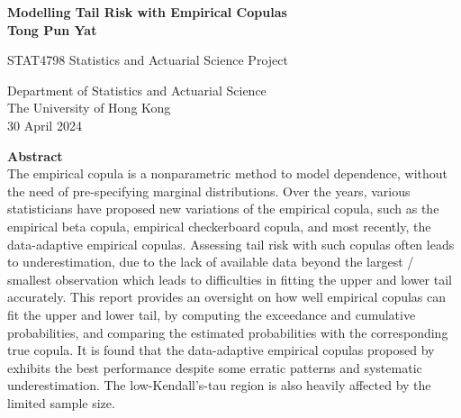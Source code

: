 \documentclass[12pt]{report}
\newcommand{\1}{\mathbf{1}}
\begin{document}
\begin{titlepage}
   \begin{center}
       \vspace*{1cm}
        \LARGE
       \textbf{Modelling Tail Risk with Empirical Copulas} \\

       \vspace{2cm}
        \LARGE
       \textbf{Tong Pun Yat}

       
        
       \vspace{7.0cm}
       \Large
       STAT4798 Statistics and Actuarial Science Project
            
       \vspace{0.8cm}
            
       Department of Statistics and Actuarial Science\\
       The University of Hong Kong\\
       30 April 2024
            
   \end{center}

\end{titlepage}

\newpage
\begin{flushleft}
\LARGE
\textbf{Abstract} \\
\normalsize
\vspace{1cm}
The empirical copula is a nonparametric method to model dependence, without the need of pre-specifying marginal distributions. Over the years, various statisticians have proposed new variations of the empirical copula, such as the empirical beta copula, empirical checkerboard copula, and most recently, the data-adaptive empirical copulas. Assessing tail risk with such copulas often leads to underestimation, due to the lack of available data beyond the largest / smallest observation which leads to difficulties in fitting the upper and lower tail accurately. This report provides an oversight on how well empirical copulas can fit the upper and lower tail, by computing the exceedance and cumulative probabilities, and comparing the estimated probabilities with the corresponding true copula. It is found that the data-adaptive empirical copulas proposed by \cite{KojadinovicYi2024Smooth} exhibits the best performance despite some erratic patterns and systematic underestimation. The low-Kendall's-tau region is also heavily affected by the limited sample size.
\end{flushleft}
\end{document}

